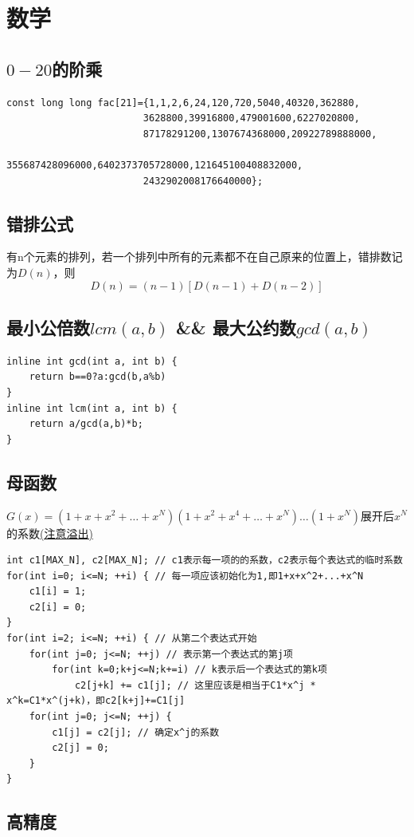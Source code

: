 \documentclass[a4paper]{ctexrep}
\begin{document}
\chapter{数学}
\section{$0-20$的阶乘}
\begin{lstlisting}
const long long fac[21]={1,1,2,6,24,120,720,5040,40320,362880,
						3628800,39916800,479001600,6227020800,
						87178291200,1307674368000,20922789888000,
						355687428096000,6402373705728000,121645100408832000,
						2432902008176640000};
\end{lstlisting}
\section{错排公式}
有n个元素的排列，若一个排列中所有的元素都不在自己原来的位置上，错排数记为$D(n)$，则
$$D(n) = (n-1)[D(n-1)+D(n-2)]$$
\section{最小公倍数$lcm(a,b)$ \&\& 最大公约数$gcd(a,b)$}
\begin{lstlisting}
inline int gcd(int a, int b) {
	return b==0?a:gcd(b,a%b)
}
inline int lcm(int a, int b) {
	return a/gcd(a,b)*b;
}
\end{lstlisting}
\section{母函数}
$G(x)=(1+x+x^2+\dots+x^N)(1+x^2+x^4+\dots+x^N)\dots(1+x^N)$展开后$x^N$的系数\underline{(注意溢出)}\\
\begin{lstlisting}
int c1[MAX_N], c2[MAX_N]; // c1表示每一项的的系数，c2表示每个表达式的临时系数
for(int i=0; i<=N; ++i) { // 每一项应该初始化为1,即1+x+x^2+...+x^N
	c1[i] = 1;
	c2[i] = 0;
}
for(int i=2; i<=N; ++i) { // 从第二个表达式开始
	for(int j=0; j<=N; ++j) // 表示第一个表达式的第j项
		for(int k=0;k+j<=N;k+=i) // k表示后一个表达式的第k项
			c2[j+k] += c1[j]; // 这里应该是相当于C1*x^j * x^k=C1*x^(j+k)，即c2[k+j]+=C1[j]
	for(int j=0; j<=N; ++j) {
		c1[j] = c2[j]; // 确定x^j的系数
		c2[j] = 0;
	}
}
\end{lstlisting}

\section{高精度}
\end{document}
